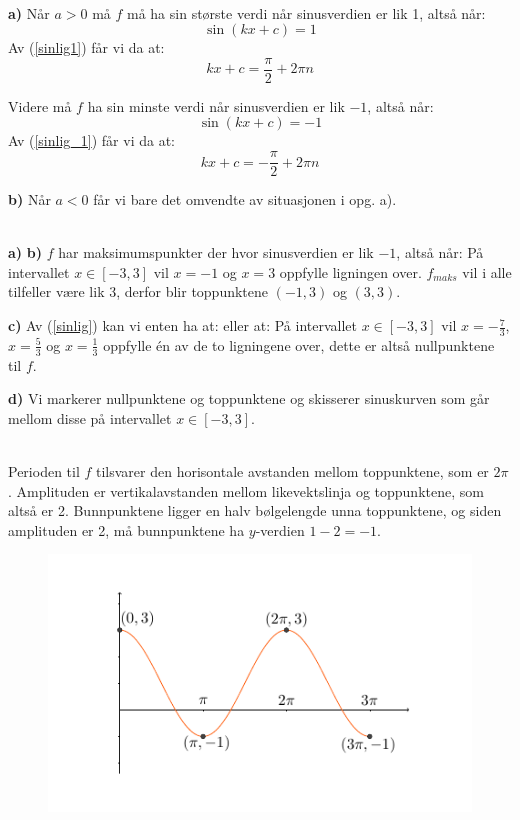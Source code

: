 \\
\textbf{a)} Når $ a>0 $ må $ f $ må ha sin største verdi når sinusverdien er lik 1, altså når:
\[ \sin(kx + c) = 1 \]
Av (\ref{sinlig1}) får vi da at:
\[ kx +c = \frac{\pi}{2}+ 2\pi n \]

Videre må $ f $ ha sin minste verdi når sinusverdien er lik $ -1 $, altså når:
\[ \sin(kx + c) = -1 \]
Av (\ref{sinlig_1}) får vi da at:
\[ kx +c = -\frac{\pi}{2}+2\pi n \]

\textbf{b)} Når $ a<0 $ får vi bare det omvendte av situasjonen i opg. a).\vsk 

\\
\textbf{a)} 
\textbf{b)} $ f $ har maksimumspunkter der hvor sinusverdien er lik $ -1 $, altså når:
På intervallet $ x\in[-3, 3] $ vil $ x=-1 $ og $ x=3 $ oppfylle ligningen over. $ f_{maks} $ vil i alle tilfeller være lik 3, derfor blir toppunktene $ (-1, 3) $ og $ (3, 3) $.\vsk

\textbf{c)} 
Av (\ref{sinlig}) kan vi enten ha at:
eller at:
På intervallet $ x\in[-3, 3] $ vil $ x=-\frac{7}{3} $, $ x=\frac{5}{3} $ og $ x=\frac{1}{3} $ oppfylle én av de to ligningene over, dette er altså nullpunktene til $ f $.

\textbf{d)} Vi markerer nullpunktene og toppunktene og skisserer sinuskurven som går mellom disse på intervallet $ x\in[-3, 3] $.\vsk

\\
Perioden til $ f $ tilsvarer den horisontale avstanden mellom toppunktene, som er $ 2\pi $. Amplituden er vertikalavstanden mellom likevektslinja og toppunktene, som altså er 2. Bunnpunktene ligger en halv bølgelengde unna toppunktene, og siden amplituden er 2, må bunnpunktene ha $ y $-verdien $ 1-2=-1 $.\vds
\begin{figure}
	\centering
	\includegraphics[]{skissin}
\end{figure}


